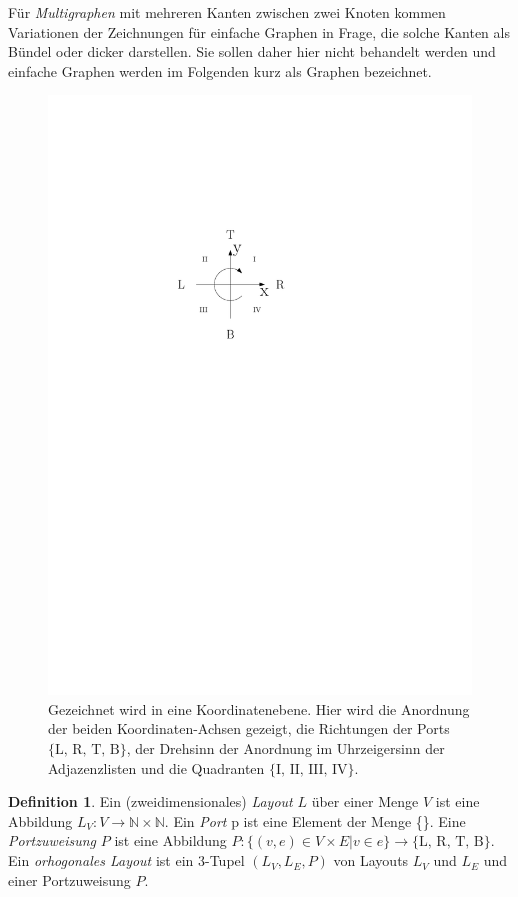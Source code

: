 \documentclass[a4paper]{scrreprt}
\theoremstyle{definition}
\newtheorem{definition}[satz]{Definition}
\newcommand{\N}{\mathbb{N}}
\begin{document}
Für \emph{Multigraphen} mit mehreren Kanten zwischen zwei Knoten kommen Variationen der Zeichnungen für einfache Graphen in Frage, die solche Kanten als Bündel oder dicker darstellen. Sie sollen daher hier nicht behandelt werden und einfache Graphen werden im Folgenden kurz als Graphen bezeichnet.

\begin{figure}[h]
  \centering
  \includegraphics{koordinatengitter}
  \caption{Gezeichnet wird in eine Koordinatenebene. Hier wird die Anordnung der beiden Koordinaten-Achsen gezeigt, die Richtungen der Ports $\{\text{L, R, T, B}\}$, der Drehsinn der Anordnung im Uhrzeigersinn der Adjazenzlisten und die Quadranten $\{\text{I, II, III, IV}\}$.}
  \label{fig:coords}
\end{figure}

\begin{definition}
  Ein (zweidimensionales) \emph{Layout} $L$ über einer Menge $V$ ist eine Abbildung $L_V : V \to \N \times \N $. Ein \emph{Port} p ist eine Element der Menge \{\}. Eine \emph{Portzuweisung} $P$ ist eine Abbildung $P: \{(v, e) \in V \times E | v \in e\} \to \{\text{L, R, T, B}\}$. Ein \emph{orhogonales Layout} ist ein 3-Tupel $(L_V,L_E,P)$ von Layouts $L_V$ und $L_E$ und einer Portzuweisung $P$.
\end{definition}
\end{document}
